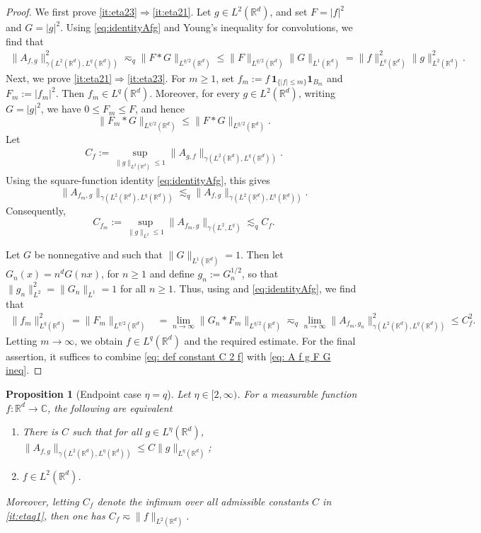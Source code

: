 \documentclass[reqno]{amsart}
\theoremstyle{plain}
\theoremstyle{remark}
\theoremstyle{plain}
\newtheorem{proposition}[theorem]{Proposition}
\numberwithin{equation}{section}
\newcommand\bR{\mathbb{R}}
\def\R{{\mathbb R}}
\def\C{{\mathbb C}}
\newcommand{\1}{\one}
\begin{document}
\begin{proof}
We first prove \eqref{it:eta23}$\Rightarrow$\eqref{it:eta21}. 
Let $g\in L^2(\R^d)$, and set $F = |f|^2$ and $G = |g|^2$. Using \eqref{eq:identityAfg} and Young's inequality for convolutions, we find that
\begin{align}
\label{eq: A f g F G ineq}
\|A_{f,g}\|_{\gamma(L^2(\R^d),L^q(\R^d))}^2  \eqsim_q \|F*G\|_{L^{q/2}(\R^d)} 
 \leq \|F\|_{L^{q/2}(\R^d)} \|G\|_{L^{1}(\R^d)} 
 = \|f\|_{L^q(\R^d)}^2 \|g\|_{L^2(\R^d)}^2. 
\end{align}
Next, we prove \eqref{it:eta21}$\Rightarrow$\eqref{it:eta23}. 
%
For \(m\geq 1\), set $f_{m}:=f\,\mathbf 1_{\{|f|\leq m\}}\mathbf 1_{B_m}$ and $F_{m}:=|f_{m}|^2$.
Then \(f_{m}\in L^q(\mathbb R^d)\). Moreover, for every
\(g\in L^2(\mathbb R^d)\), writing \(G=|g|^2\), we have
\(0\leq F_m\leq F\), and hence
\[
\|F_{m}*G\|_{L^{q/2}(\mathbb R^d)}
\leq
\|F*G\|_{L^{q/2}(\mathbb R^d)}.
\]
Let
\begin{align}
\label{eq: def constant C 2 f}
C_{f}:=\sup_{\|g\|_{L^2(\R^d)}\leq 1} \|A_{g,f}\|_{\gamma(L^2(\R^d),L^q(\R^d))}.
\end{align}
Using the square-function identity \eqref{eq:identityAfg}, this gives
\[
\|A_{f_{m},g}\|_{\gamma(L^2(\mathbb R^d),L^q(\mathbb R^d))}
\lesssim_q
\|A_{f,g}\|_{\gamma(L^2(\mathbb R^d),L^q(\mathbb R^d))}.
\]
Consequently,
\[
C_{f_{m}}
:=
\sup_{\|g\|_{L^2}\leq1}
\|A_{f_{m},g}\|_{\gamma(L^2,L^q)}
\lesssim_q C_f .
\]

Let $G$ be nonnegative and such that $\|G\|_{L^1(\bR^d)}=1$. 
Then let $G_n(x) = n^dG(nx)$, for $n\geq 1$ and define $g_n:=G_n^{1/2}$, so that 
$\|g_n\|_{L^2}^2 = \|G_n\|_{L^1} = 1$ for all $n\geq 1$.
Thus, using \cite[Proposition 1.2.32]{HNVW1} and \eqref{eq:identityAfg}, we find that 
\begin{align}
\|f_{m}\|_{L^q(\R^d)}^2 = \|F_{m}\|_{L^{q/2}(\R^d)}& = \lim_{n\to \infty} \|G_n*F_{m}\|_{L^{q/2}(\R^d)} \eqsim_q\lim_{n\to\infty}\|A_{f_m,g_n}\|_{\gamma(L^2(\R^d),L^q(\R^d))}^2
\leq C_{f}^2.
\end{align}
Letting $m\to \infty$, we obtain $f\in L^q(\R^d)$ and the required estimate. For the final assertion, it suffices to combine \eqref{eq: def constant C 2 f} with \eqref{eq: A f g F G ineq}.
\end{proof}


\begin{proposition}[Endpoint case $\eta=q$]\label{prop:etaq}
Let 
$\eta\in [2, \infty)$. For a measurable function $f:\R^d\to \C$, the following are equivalent 
  \begin{enumerate}[\rm (1)]
  \item\label{it:etaq1} There is $C$ such that for all $g\in L^\eta(\R^d)$, $\|A_{f,g}\|_{\gamma(L^2(\R^d), L^{\eta}(\R^d))}\leq C \|g\|_{L^\eta(\R^d)}$;
  \item\label{it:etaq3} $f\in L^2(\R^d)$. 
  \end{enumerate}
Moreover, letting $C_{f}$ denote the infimum over all admissible constants $C$ in \eqref{it:etaq1}, then one has 
$C_{f} \eqsim  \|f\|_{L^2(\R^d)}.$
\end{proposition}
\end{document}
